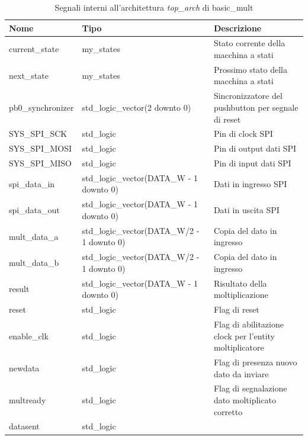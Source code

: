 \documentclass[titlepage]{report}
\begin{document}
			\begin{table}[H]
				\centering
				\begin{tabular}{|p{}|p{0.4\textwidth}|p{}|}
					\hline
					\textbf{Nome} & \textbf{Tipo} & \textbf{Descrizione} \\
					\hline
					current\_state & my\_states & Stato corrente della macchina a stati \\
					next\_state & my\_states & Prossimo stato della macchina a stati \\
					pb0\_synchronizer & std\_logic\_vector(2 downto 0) & Sincronizzatore del pushbutton per segnale di reset \\
					SYS\_SPI\_SCK & std\_logic & Pin di clock SPI \\
					SYS\_SPI\_MOSI & std\_logic & Pin di output dati SPI \\
					SYS\_SPI\_MISO & std\_logic & Pin di input dati SPI \\
					spi\_data\_in & std\_logic\_vector(DATA\_W - 1 downto 0) & Dati in ingresso SPI \\
					spi\_data\_out & std\_logic\_vector(DATA\_W - 1 downto 0) & Dati in uscita SPI \\
					mult\_data\_a & std\_logic\_vector(DATA\_W/2 - 1 downto 0) & Copia del dato in ingresso \\
					mult\_data\_b & std\_logic\_vector(DATA\_W/2 - 1 downto 0) & Copia del dato in ingresso \\
					result & std\_logic\_vector(DATA\_W - 1 downto 0) & Risultato della moltiplicazione \\
					reset & std\_logic & Flag di reset \\
					enable\_clk & std\_logic & Flag di abilitazione clock per l'entity moltiplicatore \\
					newdata & std\_logic & Flag di presenza nuovo dato da inviare \\
					multready & std\_logic & Flag di segnalazione dato moltiplicato corretto \\
					datasent & std\_logic & \\
					\hline
				\end{tabular}
				\caption{Segnali interni all'architettura \textit{top\_arch} di basic\_mult}
				\label{tab:signal_arch_basic_mult_internal}
			\end{table}
\end{document}
